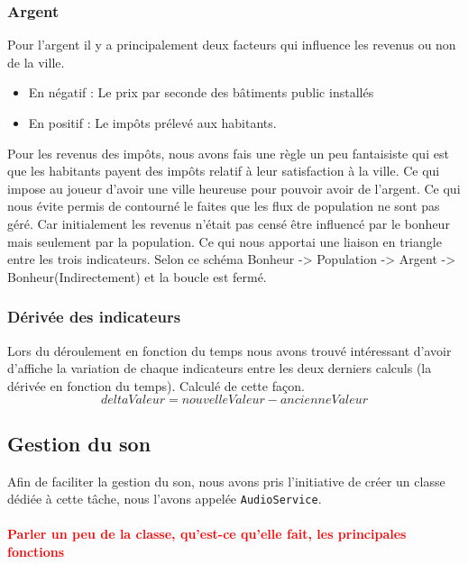 \documentclass[a4paper,10pt,openany,oneside]{report}
\begin{document}
\subsubsection{Argent}
Pour l'argent il y a principalement deux facteurs qui influence les revenus ou non de la ville.
\begin{itemize}
	\item En négatif : Le prix par seconde des bâtiments public installés
	\item En positif : Le impôts prélevé aux habitants.
\end{itemize}
Pour les revenus des impôts, nous avons fais une règle un peu fantaisiste qui est que les habitants payent des impôts relatif à leur satisfaction à la ville. Ce qui impose au joueur d'avoir une ville heureuse pour pouvoir avoir de l'argent. Ce qui nous évite permis de contourné le faites que les flux de population ne sont pas géré. Car initialement les revenus n'était pas censé être influencé par le bonheur mais seulement par la population. Ce qui nous apportai une liaison en triangle entre les trois indicateurs.
Selon ce schéma Bonheur -> Population -> Argent -> Bonheur(Indirectement) et la boucle est fermé.

\subsubsection{Dérivée des indicateurs}
Lors du déroulement en fonction du temps nous avons trouvé intéressant d'avoir d'affiche la variation de chaque indicateurs entre les deux derniers calculs (la dérivée en fonction du temps). Calculé de cette façon. \[deltaValeur = nouvelleValeur - ancienneValeur\]

\subsection{Gestion du son}
Afin de faciliter la gestion du son, nous avons pris l'initiative de créer un classe dédiée à cette tâche, nous l'avons appelée \texttt{AudioService}.
\paragraph{}
\textbf{\textcolor{red}{Parler un peu de la classe, qu'est-ce qu'elle fait, les principales fonctions}}
\end{document}
